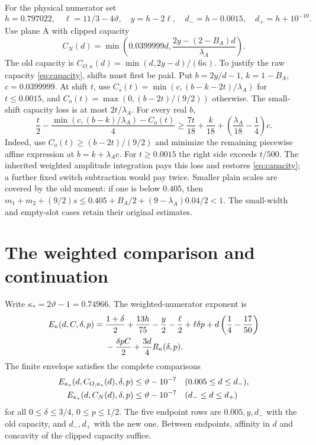 \documentclass[10pt,a4paper]{article}
\newcommand{\tht}{\vartheta}
\newcommand{\kap}{\kappa}
\begin{document}
For the physical numerator set
\[
 h=0.797022,\quad \ell=11/3-4\tht,\quad y=h-2\ell,\quad
 d_-=h-0.0015,\quad d_+=h+10^{-10}.
\]
Use plane A with clipped capacity
\begin{equation}\label{eq:capacity}
 C_N(d)=\min\left(0.0399999d,
       \frac{2y-(2-B_A)d}{\lambda_A}\right).
\end{equation}
The old capacity is $C_{O,\kap}(d)=\min(d,2y-d)/(6\kap)$.
To justify the raw capacity \eqref{eq:capacity}, shifts must first be
paid. Put $b=2y/d-1$, $k=1-B_A$, $c=0.0399999$. At shift $t$, use
$C_s(t)=\min(c,(b-k-2t)/\lambda_A)$ for $t\le0.0015$, and
$C_o(t)=\max(0,(b-2t)/(9/2))$ otherwise. The small-shift capacity loss
is at most $2t/\lambda_A$. For every real $b$,
\begin{equation}\label{eq:shift}
 \frac t2-\frac{\min(c,(b-k)/\lambda_A)-C_o(t)}4
 \ge\frac{7t}{18}+\frac{k}{18}
           +\left(\frac{\lambda_A}{18}-\frac14\right)c.
\end{equation}
Indeed, use $C_o(t)\ge(b-2t)/(9/2)$ and minimize the remaining
piecewise affine expression at $b=k+\lambda_Ac$.
For $t\ge0.0015$ the right side exceeds $t/500$.
The inherited weighted amplitude integration pays this loss and restores
\eqref{eq:capacity}; a further fixed switch subtraction would pay twice.
Smaller plain scales are covered by the old moment: if one is below
$0.405$, then
$m_1+m_2+(9/2)s\le0.405+B_A/2+(9-\lambda_A)0.04/2<1$.
The small-width and empty-slot cases retain their original estimates.

\newpage
\section{The weighted comparison and continuation}
Write $\kap_*=2\tht-1=0.74966$. The weighted-numerator exponent is
\begin{align}\label{eq:row}
 E_\kap(d,C,\delta,p)={}&\frac{1+\delta}{2}+
 \frac{13h}{75}-\frac y2-\frac\ell2+\ell\delta p
 +d\left(\frac14-\frac{17}{50}\right)\notag\\
 &-\frac{\delta pC}{2}+\frac{3d}{4}R_\kap(\delta,p).
\end{align}
The finite envelope satisfies the complete comparisons
\begin{align}\label{eq:rows}
 E_{\kap_*}(d,C_{O,\kap_*}(d),\delta,p)&\le\tht-10^{-7}
       &&(0.005\le d\le d_-),\notag\\
 E_{\kap_*}(d,C_N(d),\delta,p)&\le\tht-10^{-7}
       &&(d_-\le d\le d_+)
\end{align}
for all $0\le\delta\le3/4$, $0\le p\le1/2$.
The five endpoint rows are $0.005,y,d_-$ with the old capacity, and
$d_-,d_+$ with the new one. Between endpoints, affinity in $d$ and
concavity of the clipped capacity suffice.
\end{document}
